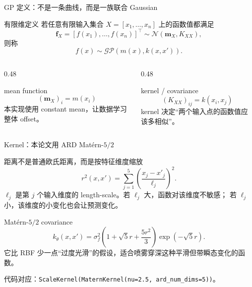 \documentclass[aspectratio=169,11pt]{beamer}
\begin{document}
\begin{frame}{GP 定义：不是一条曲线，而是一族联合 Gaussian}
\small
\begin{block}{有限维定义}
\footnotesize
若任意有限输入集合 \(X=[x_1,\ldots,x_n]\) 上的函数值都满足
\[
\mathbf f_X=[f(x_1),\ldots,f(x_n)]^\top
\sim
\mathcal N(\mathbf m_X,K_{XX}),
\]
则称
\[
f(x)\sim\mathcal{GP}(m(x),k(x,x')).
\]
\end{block}

\begin{columns}[T,onlytextwidth]
\begin{column}{0.48\linewidth}
\begin{block}{mean function}
\footnotesize
\[
(\mathbf m_X)_i=m(x_i)
\]
本实现使用 constant mean，让数据学习整体 offset。
\end{block}
\end{column}
\begin{column}{0.48\linewidth}
\begin{block}{kernel / covariance}
\footnotesize
\[
(K_{XX})_{ij}=k(x_i,x_j)
\]
kernel 决定“两个输入点的函数值应该多相似”。
\end{block}
\end{column}
\end{columns}
\end{frame}

\begin{frame}{Kernel：本论文用 ARD Matérn-\(5/2\)}
\small
\begin{block}{距离不是普通欧氏距离，而是按特征维度缩放}
\footnotesize
\[
r^2(x,x')=\sum_{j=1}^{5}\left(\frac{x_j-x'_j}{\ell_j}\right)^2.
\]
\(\ell_j\) 是第 \(j\) 个输入维度的 length-scale。若 \(\ell_j\) 大，函数对该维度不敏感；
若 \(\ell_j\) 小，该维度的小变化也会让预测变化。
\end{block}

\begin{block}{Matérn-\(5/2\) covariance}
\footnotesize
\[
k_\theta(x,x')=\sigma_f^2
\left(1+\sqrt{5}r+\frac{5r^2}{3}\right)\exp(-\sqrt{5}r).
\]
它比 RBF 少一点“过度光滑”的假设，适合喷雾穿深这种平滑但带瞬态变化的函数。
\end{block}

\vspace{-0.2em}
\footnotesize
代码对应：\texttt{ScaleKernel(MaternKernel(nu=2.5, ard\_num\_dims=5))}。
\end{frame}
\end{document}
